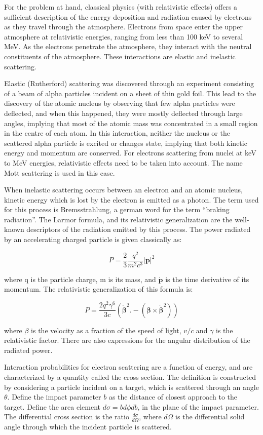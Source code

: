 For the problem at hand, classical physics (with relativistic effects) offers a sufficient description of the energy deposition and radiation caused by electrons as they travel through the atmosphere. Electrons from space enter the upper atmosphere at relativistic energies, ranging from less than 100 keV to several MeV. As the electrons penetrate the atmosphere, they interact with the neutral constituents of the atmosphere. These interactions are elastic and inelastic scattering.

Elastic (Rutherford) scattering was discovered through an experiment consisting of a  beam of alpha particles incident on a sheet of thin gold foil. This lead to the discovery of the atomic nucleus by observing that few alpha particles were deflected, and when this happened, they were mostly deflected through large angles, implying that most of the atomic mass was concentrated in a small region in the centre of each atom. In this interaction, neither the nucleus or the scattered alpha particle is excited or changes state, implying that both kinetic energy and momentum are conserved. For electrons scattering from nuclei at keV to MeV energies, relativistic effects need to be taken into account. The name Mott scattering is used in this case. 

When inelastic scattering occurs between an electron and an atomic nucleus, kinetic energy which is lost by the electron is emitted as a photon. The term used for this process is Bremsstrahlung, a german word for the term ``braking radiation''. The Larmor formula, and its relativistic generalization are the well-known descriptors of the radiation emitted by this process. The power radiated by an accelerating charged particle is given classically as:

$$P = \frac{2}{3}\frac{q^2}{m^2c^3}\lvert \mathbf{\dot{p}} \rvert^2$$

where q is the particle charge, m is its mass, and $\mathbf{\dot{p}}$ is the time derivative of its momentum. The relativistic generalization of this formula is:

$$P = \frac{2 q^2 \gamma^6}{3c} \left( \dot{\mathbf{\beta}}^2.- (\mathbf{\beta}\times\mathbf{\dot{\mathbf{\beta}}}^2)\right)$$

where $\beta$ is the velocity as a fraction of the speed of light, $v/c$ and $\gamma$ is the relativistic factor. There are also expressions for the angular distribution of the radiated power. 

Interaction probabilities for electron scattering are a function of energy, and are characterized by a quantity called the cross section. The definition is constructed by considering a particle incident on a target, which is scattered through an angle $\theta$. Define the impact parameter $b$ as the distance of closest approach to the target. Define the area element $d\sigma = b d\phi db$, in the plane of the impact parameter. The differential cross section is the ratio $\frac{d\sigma}{d\Omega}$, where $d\Omega$ is the differential solid angle through which the incident particle is scattered. 

